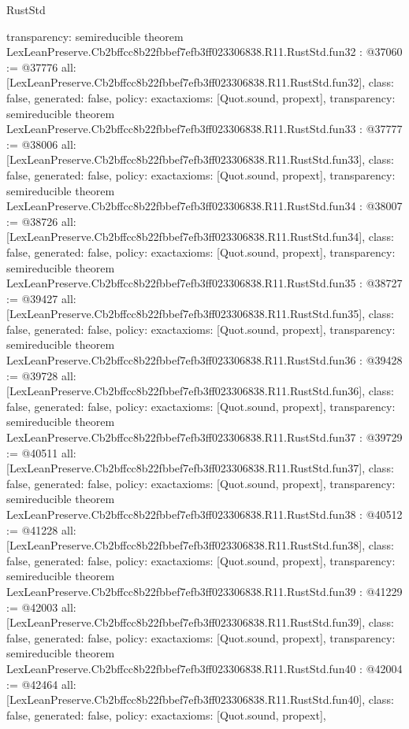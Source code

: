 \begin{lexlean}{RustStd}
\begin{coremodule}
{  transparency: semireducible
}
theorem LexLeanPreserve.Cb2bffcc8b22fbbef7efb3ff023306838.R11.RustStd.fun32 : @37060 := @37776 {
  all: [LexLeanPreserve.Cb2bffcc8b22fbbef7efb3ff023306838.R11.RustStd.fun32],
  class: false,
  generated: false,
  policy: exact{axioms: [Quot.sound, propext]},
  transparency: semireducible
}
theorem LexLeanPreserve.Cb2bffcc8b22fbbef7efb3ff023306838.R11.RustStd.fun33 : @37777 := @38006 {
  all: [LexLeanPreserve.Cb2bffcc8b22fbbef7efb3ff023306838.R11.RustStd.fun33],
  class: false,
  generated: false,
  policy: exact{axioms: [Quot.sound, propext]},
  transparency: semireducible
}
theorem LexLeanPreserve.Cb2bffcc8b22fbbef7efb3ff023306838.R11.RustStd.fun34 : @38007 := @38726 {
  all: [LexLeanPreserve.Cb2bffcc8b22fbbef7efb3ff023306838.R11.RustStd.fun34],
  class: false,
  generated: false,
  policy: exact{axioms: [Quot.sound, propext]},
  transparency: semireducible
}
theorem LexLeanPreserve.Cb2bffcc8b22fbbef7efb3ff023306838.R11.RustStd.fun35 : @38727 := @39427 {
  all: [LexLeanPreserve.Cb2bffcc8b22fbbef7efb3ff023306838.R11.RustStd.fun35],
  class: false,
  generated: false,
  policy: exact{axioms: [Quot.sound, propext]},
  transparency: semireducible
}
theorem LexLeanPreserve.Cb2bffcc8b22fbbef7efb3ff023306838.R11.RustStd.fun36 : @39428 := @39728 {
  all: [LexLeanPreserve.Cb2bffcc8b22fbbef7efb3ff023306838.R11.RustStd.fun36],
  class: false,
  generated: false,
  policy: exact{axioms: [Quot.sound, propext]},
  transparency: semireducible
}
theorem LexLeanPreserve.Cb2bffcc8b22fbbef7efb3ff023306838.R11.RustStd.fun37 : @39729 := @40511 {
  all: [LexLeanPreserve.Cb2bffcc8b22fbbef7efb3ff023306838.R11.RustStd.fun37],
  class: false,
  generated: false,
  policy: exact{axioms: [Quot.sound, propext]},
  transparency: semireducible
}
theorem LexLeanPreserve.Cb2bffcc8b22fbbef7efb3ff023306838.R11.RustStd.fun38 : @40512 := @41228 {
  all: [LexLeanPreserve.Cb2bffcc8b22fbbef7efb3ff023306838.R11.RustStd.fun38],
  class: false,
  generated: false,
  policy: exact{axioms: [Quot.sound, propext]},
  transparency: semireducible
}
theorem LexLeanPreserve.Cb2bffcc8b22fbbef7efb3ff023306838.R11.RustStd.fun39 : @41229 := @42003 {
  all: [LexLeanPreserve.Cb2bffcc8b22fbbef7efb3ff023306838.R11.RustStd.fun39],
  class: false,
  generated: false,
  policy: exact{axioms: [Quot.sound, propext]},
  transparency: semireducible
}
theorem LexLeanPreserve.Cb2bffcc8b22fbbef7efb3ff023306838.R11.RustStd.fun40 : @42004 := @42464 {
  all: [LexLeanPreserve.Cb2bffcc8b22fbbef7efb3ff023306838.R11.RustStd.fun40],
  class: false,
  generated: false,
  policy: exact{axioms: [Quot.sound, propext]},
}
\end{coremodule}
\end{lexlean}
